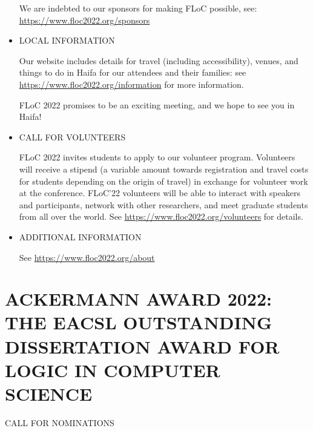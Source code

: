 \documentclass[prodmode,acmtecs]{acmsmall} %
\begin{document}
\begin{itemize}
  We are indebted to our sponsors for making FLoC possible, see: \href{https://www.floc2022.org/sponsors}{https://www.floc2022.org/sponsors} 
 
\item  LOCAL INFORMATION 
 
  Our website includes details for travel (including accessibility), venues, and things to do in Haifa for our attendees and their families: see \href{https://www.floc2022.org/information}{https://www.floc2022.org/information} for more information. 
 
  FLoC 2022 promises to be an exciting meeting, and we hope to see you in Haifa! 
 
\item  CALL FOR VOLUNTEERS 
 
  FLoC 2022 invites students to apply to our volunteer program. Volunteers will receive a stipend (a variable amount towards registration and travel costs for students depending on the origin of travel) in exchange for volunteer work at the conference. FLoC’22 volunteers will be able to interact with speakers and participants, network with other researchers, and meet graduate students from all over the world. See \href{https://www.floc2022.org/volunteers}{https://www.floc2022.org/volunteers} for details. 
 
\item  ADDITIONAL INFORMATION 
 
  See \href{https://www.floc2022.org/about}{https://www.floc2022.org/about} 
 
\end{itemize}\section{ACKERMANN AWARD 2022: THE EACSL OUTSTANDING DISSERTATION AWARD FOR LOGIC IN COMPUTER SCIENCE}\label{ACKERMANNAWARD2022}CALL FOR NOMINATIONS 
\end{document}
